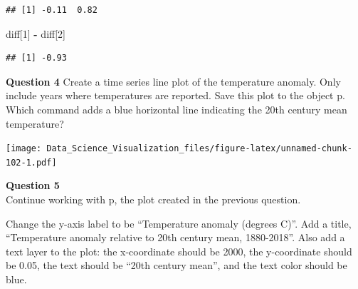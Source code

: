 \documentclass[
]{article}
\newenvironment{Shaded}{\begin{snugshade}}{\end{snugshade}}
\newcommand{\DataTypeTok}[1]{\textcolor[rgb]{0.13,0.29,0.53}{#1}}
\newcommand{\DecValTok}[1]{\textcolor[rgb]{0.00,0.00,0.81}{#1}}
\newcommand{\KeywordTok}[1]{\textcolor[rgb]{0.13,0.29,0.53}{\textbf{#1}}}
\newcommand{\NormalTok}[1]{#1}
\newcommand{\OperatorTok}[1]{\textcolor[rgb]{0.81,0.36,0.00}{\textbf{#1}}}
\newcommand{\StringTok}[1]{\textcolor[rgb]{0.31,0.60,0.02}{#1}}
\begin{document}
\begin{verbatim}
## [1] -0.11  0.82
\end{verbatim}

\begin{Shaded}
\begin{Highlighting}[]
\NormalTok{diff[}\DecValTok{1}\NormalTok{] }\OperatorTok{-}\StringTok{ }\NormalTok{diff[}\DecValTok{2}\NormalTok{]}
\end{Highlighting}
\end{Shaded}

\begin{verbatim}
## [1] -0.93
\end{verbatim}

\textbf{Question 4} Create a time series line plot of the temperature
anomaly. Only include years where temperatures are reported. Save this
plot to the object p.\\
Which command adds a blue horizontal line indicating the 20th century
mean temperature?

\begin{Shaded}
\end{Shaded}

\texttt{[image: Data\_Science\_Visualization\_files/figure-latex/unnamed-chunk-102-1.pdf]}

\textbf{Question 5}\\
Continue working with p, the plot created in the previous question.

Change the y-axis label to be ``Temperature anomaly (degrees C)''. Add a
title, ``Temperature anomaly relative to 20th century mean, 1880-2018''.
Also add a text layer to the plot: the x-coordinate should be 2000, the
y-coordinate should be 0.05, the text should be ``20th century mean'',
and the text color should be blue.
\end{document}

